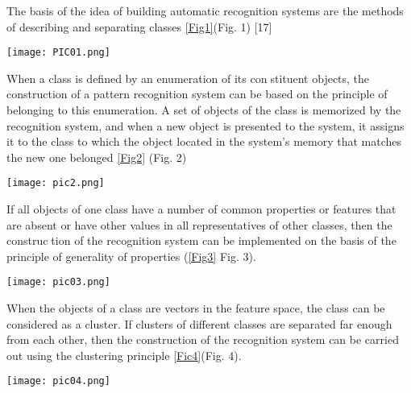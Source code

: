 \documentclass[10pt, a4paper]{article}
\begin{document}
\begin{multicols}{2}
\par
The basis of the idea of building automatic recognition
systems are the methods of describing and separating
classes \ref{Fig1}(Fig. 1) [17]

 \texttt{[image: PIC01.png]}
\begin{center}
\caption{Figure 1. Principles of Pattern Recognition. }
\label{Fig1}
\end{center}

 When a class is defined by an enumeration of its constituent objects, the construction of a pattern recognition
system can be based on the principle of belonging to this
enumeration. A set of objects of the class is memorized
by the recognition system, and when a new object is
presented to the system, it assigns it to the class to which the object located in the system’s memory that matches
the new one belonged \ref{Fig2} (Fig. 2)


\newpage

\texttt{[image: pic2.png]}
\label{Fig2}
\begin{center}
\caption{ Figure 2. Enumeration of Class Members.}
\end{center}

If all objects of one class have a number of common
properties or features that are absent or have other values
in all representatives of other classes, then the construction of the recognition system can be implemented on the
basis of the principle of generality of properties (\ref{Fig3} Fig. 3).

\texttt{[image: pic03.png]}
\begin{center}
\caption{Figure 3. Generality of Properties. }
\label{Fig3}
\end{center}

When the objects of a class are vectors in the feature
space, the class can be considered as a cluster. If clusters
of different classes are separated far enough from each
other, then the construction of the recognition system can
be carried out using the clustering principle \ref{Fic4}(Fig. 4).

\texttt{[image: pic04.png]}
\begin{center}
\caption{Figure 4. Clustering}
\label{Fig4}
\end{center}



\end{multicols}
\end{document}

